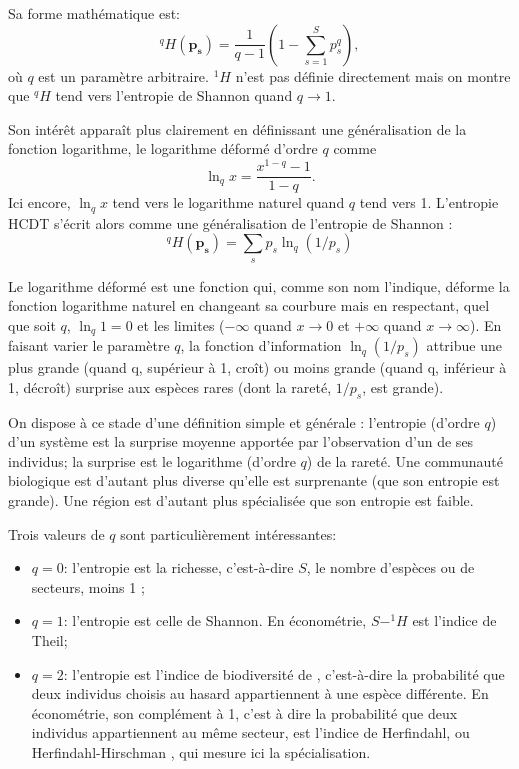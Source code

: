 \documentclass[fleqn,10pt]{ArtEcoFoG} %
\begin{document}
Sa forme mathématique est:
\[ ^{q}H(\mathbf{p_s}) = \frac{1}{q-1}\left(1-\sum^S_{s=1}{p^q_s}\right),\]
où \(q\) est un paramètre arbitraire. \(^{1}H\) n'est pas définie
directement mais on montre que \(^{q}H\) tend vers l'entropie de Shannon
quand \(q \to 1\).

Son intérêt apparaît plus clairement en définissant une généralisation
de la fonction logarithme, le logarithme déformé d'ordre \(q\)
\citep{Tsallis1994} comme \[\ln_q{x} = \frac{x^{1-q}-1}{1-q}.\] Ici
encore, \(\ln_q{x}\) tend vers le logarithme naturel quand \(q\) tend
vers 1. L'entropie HCDT s'écrit alors comme une généralisation de
l'entropie de Shannon :
\[^{q}H(\mathbf{p_s}) = \sum_{s}{p_s \ln_q{(1/p_s)}}\]

Le logarithme déformé est une fonction qui, comme son nom l'indique,
déforme la fonction logarithme naturel en changeant sa courbure mais en
respectant, quel que soit \(q\), \(\ln_q{1}=0\) et les limites
(\(-\infty\) quand \(x \to 0\) et \(+\infty\) quand \(x \to \infty\)).
En faisant varier le paramètre \(q\), la fonction d'information
\(\ln_q{(1/p_s)}\) attribue une plus grande (quand q, supérieur à 1,
croît) ou moins grande (quand q, inférieur à 1, décroît) surprise aux
espèces rares (dont la rareté, \(1/p_s\), est grande).

On dispose à ce stade d'une définition simple et générale : l'entropie
(d'ordre \(q\)) d'un système est la surprise moyenne apportée par
l'observation d'un de ses individus; la surprise est le logarithme
(d'ordre \(q\)) de la rareté. Une communauté biologique est d'autant
plus diverse qu'elle est surprenante (que son entropie est grande). Une
région est d'autant plus spécialisée que son entropie est faible.

Trois valeurs de \(q\) sont particulièrement intéressantes:

\begin{itemize}
\item
  \(q=0\): l'entropie est la richesse, c'est-à-dire \(S\), le nombre
  d'espèces ou de secteurs, moins 1 ;
\item
  \(q=1\): l'entropie est celle de Shannon. En économétrie, \(S-^{1}H\)
  est l'indice de Theil;
\item
  \(q=2\): l'entropie est l'indice de biodiversité de
  \citet{Simpson1949}, c'est-à-dire la probabilité que deux individus
  choisis au hasard appartiennent à une espèce différente. En
  économétrie, son complément à 1, c'est à dire la probabilité que deux
  individus appartiennent au même secteur, est l'indice de Herfindahl,
  ou Herfindahl-Hirschman \citep{Hirschman1964}, qui mesure ici la
  spécialisation.
\end{itemize}
\end{document}
